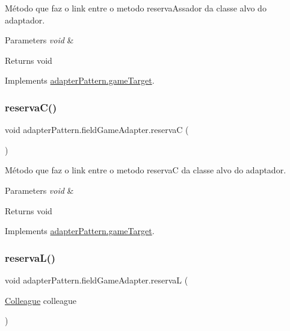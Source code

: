 Método que faz o link entre o metodo reserva\+Assador da classe alvo do adaptador. 


\begin{DoxyParams}{Parameters}
{\em void} & \\
\hline
\end{DoxyParams}
\begin{DoxyReturn}{Returns}
void 
\end{DoxyReturn}


Implements \mbox{\hyperlink{interfaceadapter_pattern_1_1game_target_a67348260f14d11e317195e2d66dbff18}{adapter\+Pattern.\+game\+Target}}.

\mbox{\label{classadapter_pattern_1_1field_game_adapter_ab9c41ada4fcec05ce596f4de3511723d}} 
\subsubsection{\texorpdfstring{reservaC()}{reservaC()}}
{\footnotesize\ttfamily void adapter\+Pattern.\+field\+Game\+Adapter.\+reservaC (\begin{DoxyParamCaption}{ }\end{DoxyParamCaption})}



Método que faz o link entre o metodo reservaC da classe alvo do adaptador. 


\begin{DoxyParams}{Parameters}
{\em void} & \\
\hline
\end{DoxyParams}
\begin{DoxyReturn}{Returns}
void 
\end{DoxyReturn}


Implements \mbox{\hyperlink{interfaceadapter_pattern_1_1game_target_ae8c1c944929700a3e120e641118c9188}{adapter\+Pattern.\+game\+Target}}.

\mbox{\label{classadapter_pattern_1_1field_game_adapter_a6a08d37797c204b6dfff86d9f827c0c5}} 
\subsubsection{\texorpdfstring{reservaL()}{reservaL()}}
{\footnotesize\ttfamily void adapter\+Pattern.\+field\+Game\+Adapter.\+reservaL (\begin{DoxyParamCaption}\item[{\mbox{\hyperlink{classmediator_pattern_1_1_colleague}{Colleague}}}]{colleague }\end{DoxyParamCaption})}



